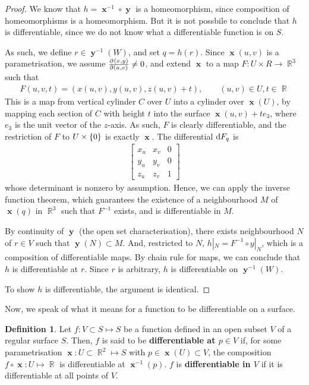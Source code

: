 \documentclass{amsart} %
\theoremstyle{mytheoremstyle}
\theoremstyle{definition}
\newtheorem{definition}{Definition}[section]
\numberwithin{equation}{section}
\DeclareMathOperator{\R}{\mathbb{R}}
\DeclareMathOperator{\1}{\mathbbm{1}}
\DeclareMathOperator{\D}{\dif}
\DeclareMathOperator{\x}{\mathbf{x}}
\DeclareMathOperator{\y}{\mathbf{y}}
\begin{document}
\begin{proof}
	We know that $h = \x^{-1} \circ \y$ is a homeomorphism, since composition of homeomorphisms is a homeomorphism. But it is not possbile to conclude that $h$ is differentiable, since we do not know what a differentiable function is on $S$. 
	
	As such, we define $r \in \y^{-1}(W)$, and set $q = h(r)$. Since $\x(u,v)$ is a parametrisation, we assume $\pd{(x,y)}{(u,v)} \neq 0$, and extend $\x$ to a map $F : U \times R \to \R^3$ such that
	\begin{align*}
	F(u,v,t) = (x(u,v), y(u,v), z(u,v) + t ), \qquad (u,v) \in U, t \in \R
	\end{align*}
	This is a map from vertical cylinder $C$ over $U$ into a cylinder over $\x(U)$, by mapping each section of $C$ with height $t$ into the surface $\x(u,v) + t e_{3}$, where $e_3$ is the unit vector of the $z$-axis. As such, $F$ is clearly differentiable, and the restriction of $F$ to $U \times \set{0}$ is exactly $\x$. The differential $\D F_q$ is
	\begin{align*}
		\begin{bmatrix}
			x_u & x_ v & 0 \\ y_u & y_v & 0 \\ z_u & z_v & 1 
		\end{bmatrix}
	\end{align*}
	whose determinant is nonzero by assumption. Hence, we can apply the inverse function theorem, which guarantees the existence of a neighbourhood $M$ of $\x(q)$ in $\R^3$ such that $F^{-1}$ exists, and is differentiable in $M$.
	
	By continuity of $\y$ (the open set characterisation), there exists neighbourhood $N$ of $ r \in V$ such that $\y(N) \subset M$. And, restricted to $N$, $h|_{N} = F^{-1} \circ y|_{N}$, which is a composition of differentiable maps. By chain rule for maps, we can conclude that $h$ is differentiable at $r$. Since $r$ is arbitrary, $h$ is differentiable on $\y^{-1} (W)$.
	
	To show $h$ is differentiable, the argument is identical.
\end{proof}


Now, we speak of what it means for a function to be differentiable on a surface.

\begin{definition}
	\label{defdifferentiabilityonsurface}
	Let $f:V \subset S \mapsto S$ be a function defined in an open subset $V$ of a regular surface $S$. Then, $f$ is said to be \textbf{differentiable at $p \in V$} if, for some parametrisation $\x: U \subset \R^2 \mapsto S$ with $p \in \x(U) \subset V$, the composition $f \circ \x: U \mapsto \R$ is differentiable at $\x^{-1} (p)$. $f$ is \textbf{differentiable in $V$} if it is differentiable at all points of $V$.
\end{definition}
\end{document}
